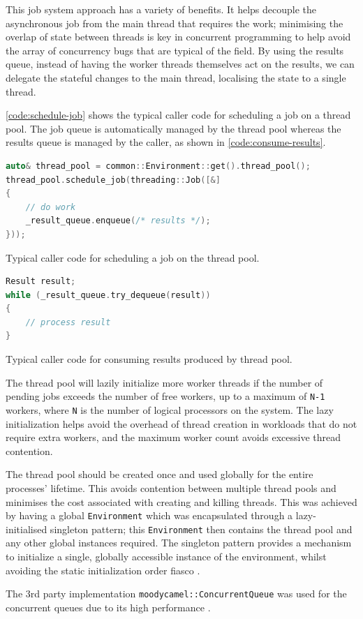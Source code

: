 This job system approach has a variety of benefits. It helps decouple the asynchronous job from the main thread that requires the work; minimising the overlap of state between threads is key in concurrent programming to help avoid the array of concurrency bugs that are typical of the field. By using the results queue, instead of having the worker threads themselves act on the results, we can delegate the stateful changes to the main thread, localising the state to a single thread.

\autoref{code:schedule-job} shows the typical caller code for scheduling a job on a thread pool. The job queue is automatically managed by the thread pool whereas the results queue is managed by the caller, as shown in \autoref{code:consume-results}.

\begin{lstfloat}[H]
    \begin{lstlisting}[language=c++]
auto& thread_pool = common::Environment::get().thread_pool();
thread_pool.schedule_job(threading::Job([&]
{
    // do work
    _result_queue.enqueue(/* results */);
}));
    \end{lstlisting}
    \caption{Typical caller code for scheduling a job on the thread pool.}
    \label{code:schedule-job}
\end{lstfloat}

\begin{lstfloat}[H]
    \begin{lstlisting}[language=c++]
Result result;
while (_result_queue.try_dequeue(result))
{
    // process result
}
    \end{lstlisting}
    \caption{Typical caller code for consuming results produced by thread pool.}
    \label{code:consume-results}
\end{lstfloat}

The thread pool will lazily initialize more worker threads if the number of pending jobs exceeds the number of free workers, up to a maximum of \texttt{N-1} workers, where \texttt{N} is the number of logical processors on the system. The lazy initialization helps avoid the overhead of thread creation in workloads that do not require extra workers, and the maximum worker count avoids excessive thread contention.

The thread pool should be created once and used globally for the entire processes' lifetime. This avoids contention between multiple thread pools and minimises the cost associated with creating and killing threads. This was achieved by having a global \texttt{Environment} which was encapsulated through a lazy-initialised singleton pattern; this \texttt{Environment} then contains the thread pool and any other global instances required. The singleton pattern provides a mechanism to initialize a single, globally accessible instance of the environment, whilst avoiding the static initialization order fiasco \cite{cpp-siof}.

The 3rd party implementation \texttt{moodycamel::ConcurrentQueue} \cite{moodycamel} was used for the concurrent queues due to its high performance \cite{moodycamel-benchmark}.

